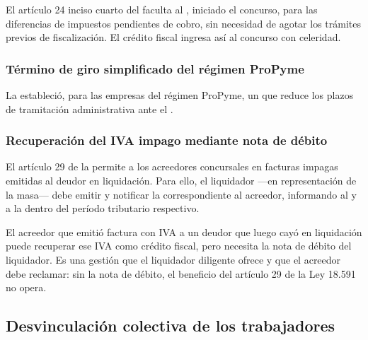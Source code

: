 El artículo 24 inciso cuarto del \ctrib{} faculta al \sii{}, iniciado el concurso,
para  las diferencias de impuestos pendientes de cobro, sin
necesidad de agotar los trámites previos de fiscalización. El crédito fiscal ingresa así al
concurso con celeridad.

\subsubsection{Término de giro simplificado del régimen ProPyme}

La  \citeyearpar{ley-21713}
estableció, para las empresas del régimen ProPyme, un  que reduce los plazos de tramitación administrativa ante el \sii{}.

\subsubsection{Recuperación del IVA impago mediante nota de débito}

El artículo 29 de la  \citeyearpar{ley-18591} permite a los acreedores
concursales  en facturas impagas
emitidas al deudor en liquidación. Para ello, el liquidador ---en representación de la masa---
debe emitir y notificar la correspondiente  al acreedor, informando al
\sii{} y a la \tgr{} dentro del período tributario respectivo.

\begin{foco}
El acreedor que emitió factura con IVA a un deudor que luego cayó en liquidación puede
recuperar ese IVA como crédito fiscal, pero necesita la nota de débito del liquidador. Es una
gestión que el liquidador diligente ofrece y que el acreedor debe reclamar: sin la nota de
débito, el beneficio del artículo 29 de la Ley 18.591 no opera.
\end{foco}

\bloquePractico

\subsection{Desvinculación colectiva de los trabajadores}

